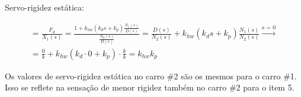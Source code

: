 \documentclass[a4paper,11pt]{article}
\begin{document}
Servo-rigidez estática:

\begin{gather*}
  = \frac{F_d}{X_1\left(s\right)} = \frac{1 + k_{hw} \left(k_d s + k_p\right)
    \frac{N_1\left(s\right)}{D\left(s\right)}}
    {\frac{N_2\left(s\right)}{D\left(s\right)}} =
    \frac{D\left(s\right)}{N_2\left(s\right)} + k_{hw}
    \left(k_d s + k_p\right) \frac{N_1\left(s\right)}{N_2\left(s\right)}
    \xrightarrow{\text{s = 0}} \\
  = \frac{0}{k} + k_{hw} \left(k_d \cdot 0 + k_p\right) \cdot \frac{k}{k} =
    k_{hw} k_p
\end{gather*}

Os valores de servo-rigidez estática no carro \#2 são os mesmos para o carro
\#1. Isso se reflete na sensação de menor rigidez também no carro \#2 para o
item 5.
\end{document}
